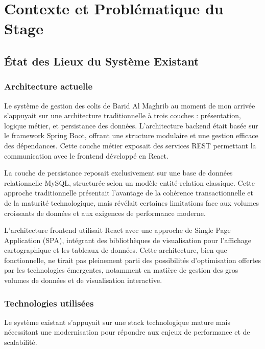 \chapter{Contexte et Problématique du Stage}

\section{État des Lieux du Système Existant}

\subsection{Architecture actuelle}

Le système de gestion des colis de Barid Al Maghrib au moment de mon arrivée s'appuyait sur une architecture traditionnelle à trois couches : présentation, logique métier, et persistance des données. L'architecture backend était basée sur le framework Spring Boot, offrant une structure modulaire et une gestion efficace des dépendances. Cette couche métier exposait des services REST permettant la communication avec le frontend développé en React.

La couche de persistance reposait exclusivement sur une base de données relationnelle MySQL, structurée selon un modèle entité-relation classique. Cette approche traditionnelle présentait l'avantage de la cohérence transactionnelle et de la maturité technologique, mais révélait certaines limitations face aux volumes croissants de données et aux exigences de performance moderne.

L'architecture frontend utilisait React avec une approche de Single Page Application (SPA), intégrant des bibliothèques de visualisation pour l'affichage cartographique et les tableaux de données. Cette architecture, bien que fonctionnelle, ne tirait pas pleinement parti des possibilités d'optimisation offertes par les technologies émergentes, notamment en matière de gestion des gros volumes de données et de visualisation interactive.

\subsection{Technologies utilisées}

Le système existant s'appuyait sur une stack technologique mature mais nécessitant une modernisation pour répondre aux enjeux de performance et de scalabilité.

